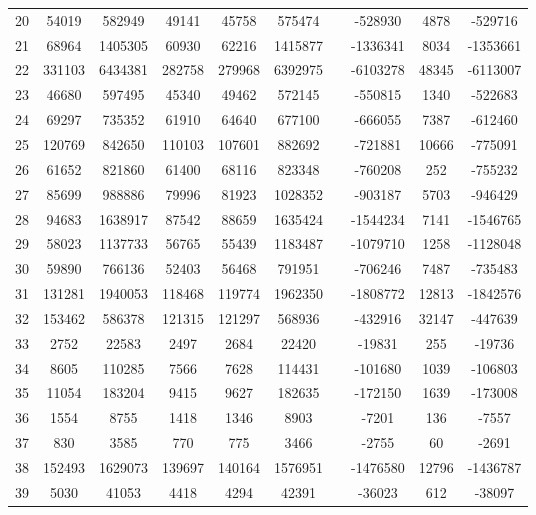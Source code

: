 \documentclass{article}
\begin{document}
\begin{table}[h!]
\begin{tabular}{c||c|c|c||c|c c c|c|c}
20 & 54019 & 582949 & 49141 & 45758 & 575474 &  & -528930 & 4878 & -529716 \\
21 & 68964 & 1405305 & 60930 & 62216 & 1415877 &  & -1336341 & 8034 & -1353661 \\
22 & 331103 & 6434381 & 282758 & 279968 & 6392975 &  & -6103278 & 48345 & -6113007 \\
23 & 46680 & 597495 & 45340 & 49462 & 572145 &  & -550815 & 1340 & -522683 \\
24 & 69297 & 735352 & 61910 & 64640 & 677100 &  & -666055 & 7387 & -612460 \\
25 & 120769 & 842650 & 110103 & 107601 & 882692 &  & -721881 & 10666 & -775091 \\
26 & 61652 & 821860 & 61400 & 68116 & 823348 &  & -760208 & 252 & -755232 \\
27 & 85699 & 988886 & 79996 & 81923 & 1028352 &  & -903187 & 5703 & -946429 \\
28 & 94683 & 1638917 & 87542 & 88659 & 1635424 &  & -1544234 & 7141 & -1546765 \\
29 & 58023 & 1137733 & 56765 & 55439 & 1183487 &  & -1079710 & 1258 & -1128048 \\
30 & 59890 & 766136 & 52403 & 56468 & 791951 &  & -706246 & 7487 & -735483 \\
31 & 131281 & 1940053 & 118468 & 119774 & 1962350 &  & -1808772 & 12813 & -1842576 \\
32 & 153462 & 586378 & 121315 & 121297 & 568936 &  & -432916 & 32147 & -447639 \\
33 & 2752 & 22583 & 2497 & 2684 & 22420 &  & -19831 & 255 & -19736 \\
34 & 8605 & 110285 & 7566 & 7628 & 114431 &  & -101680 & 1039 & -106803 \\
35 & 11054 & 183204 & 9415 & 9627 & 182635 &  & -172150 & 1639 & -173008 \\
36 & 1554 & 8755 & 1418 & 1346 & 8903 &  & -7201 & 136 & -7557 \\
37 & 830 & 3585 & 770 & 775 & 3466 &  & -2755 & 60 & -2691 \\
38 & 152493 & 1629073 & 139697 & 140164 & 1576951 &  & -1476580 & 12796 & -1436787 \\
39 & 5030 & 41053 & 4418 & 4294 & 42391 &  & -36023 & 612 & -38097 \\
 \end{tabular}
\end{table}
\end{document}
